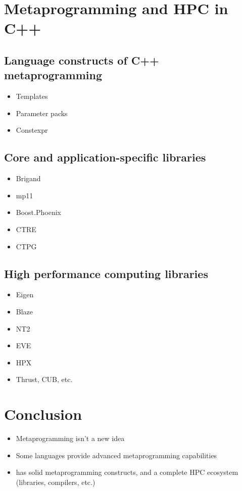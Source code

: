 \documentclass[../../main.tex]{subfiles}
\begin{document}
\section{Metaprogramming and HPC in C++} \label{lbl:meta-cpp}

\subsection{Language constructs of C++ metaprogramming}

\begin{itemize}
\item Templates

\item Parameter packs

\item Constexpr
\end{itemize}

\subsection{Core and application-specific libraries}

\begin{itemize}
\item Brigand

\item mp11
\end{itemize}


\begin{itemize}
\item Boost.Phoenix

\item CTRE

\item CTPG
\end{itemize}

\subsection{High performance computing libraries}

\begin{itemize}
\item Eigen

\item Blaze

\item NT2

\item EVE

\item HPX

\item Thrust, CUB, etc.
\end{itemize}

\section{Conclusion}

\begin{itemize}
\item Metaprogramming isn't a new idea

\item Some languages provide advanced metaprogramming capabilities

\item \cpp has solid metaprogramming constructs, and a complete HPC ecosystem
(libraries, compilers, etc.)
\end{itemize}
\end{document}
